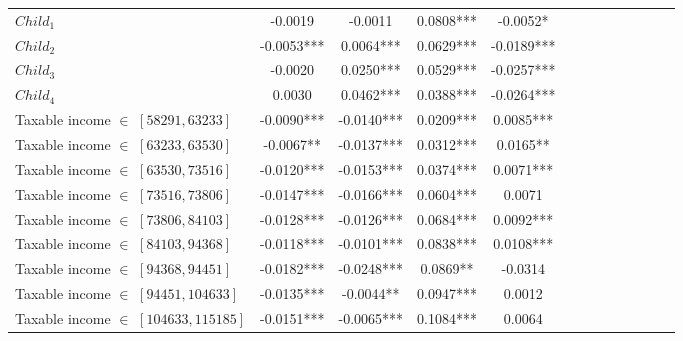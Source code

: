\begin{table}[H]
{\begin{tabular}{lcccccccccccc}
\midrule
$Child_1$                                         & -0.0019                 &     -0.0011                &   0.0808***                    &  -0.0052*                    \\
$Child_2$                                         & -0.0053***              &     0.0064***              &   0.0629***                    &  -0.0189***                  \\
$Child_3$                                         & -0.0020                 &     0.0250***              &   0.0529***                    &  -0.0257***                  \\
$Child_4$                                         & 0.0030                  &     0.0462***              &   0.0388***                    &  -0.0264***                  \\
\midrule
Taxable income $\in$ $[58291,63233]$              & -0.0090***              &     -0.0140***             &   0.0209***                    &  0.0085***                   \\
Taxable income $\in$ $[63233,63530]$              & -0.0067**               &     -0.0137***             &   0.0312***                    &  0.0165**                    \\
Taxable income $\in$ $[63530,73516]$              & -0.0120***              &     -0.0153***             &   0.0374***                    &  0.0071***                   \\
Taxable income $\in$ $[73516,73806]$              & -0.0147***              &     -0.0166***             &   0.0604***                    &  0.0071                      \\
Taxable income $\in$ $[73806,84103]$              & -0.0128***              &     -0.0126***             &   0.0684***                    &  0.0092***                   \\
Taxable income $\in$ $[84103,94368]$              & -0.0118***              &     -0.0101***             &   0.0838***                    &  0.0108***                   \\
Taxable income $\in$ $[94368,94451]$              & -0.0182***              &     -0.0248***             &   0.0869**                     &  -0.0314                     \\
Taxable income $\in$ $[94451,104633]$             & -0.0135***              &     -0.0044**              &   0.0947***                    &  0.0012                      \\
Taxable income $\in$ $[104633,115185]$            & -0.0151***              &     -0.0065***             &   0.1084***                    &  0.0064                      \\

\end{tabular}}
\end{table}
